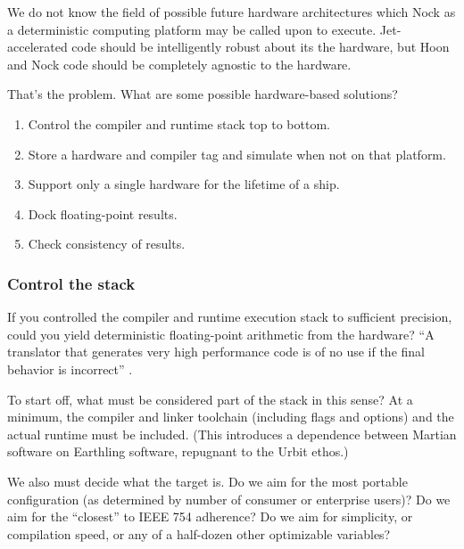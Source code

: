 \documentclass[twoside]{article}
\begin{document}
We do not know the field of possible future hardware architectures which Nock as a deterministic computing platform may be called upon to execute.  Jet-accelerated code should be intelligently robust about its the hardware, but Hoon and Nock code should be completely agnostic to the hardware.

That's the problem.  What are some possible hardware-based solutions?

\begin{enumerate}
  \item  Control the compiler and runtime stack top to bottom.
  \item  Store a hardware and compiler tag and simulate when not on that platform.
  \item  Support only a single hardware for the lifetime of a ship.
  \item  Dock floating-point results.
  \item  Check consistency of results.
\end{enumerate}

\subsubsection{Control the stack}

If you controlled the compiler and runtime execution stack to sufficient precision, could you yield deterministic floating-point arithmetic from the hardware?  “A translator that generates very high performance code is of no use if the final behavior is incorrect” \citep[p.~189]{Jones2008}.

To start off, what must be considered part of the stack in this sense?  At a minimum, the compiler and linker toolchain (including flags and options) and the actual runtime must be included.  (This introduces a dependence between Martian software on Earthling software, repugnant to the Urbit ethos.)

We also must decide what the target is.  Do we aim for the most portable configuration (as determined by number of consumer or enterprise users)?  Do we aim for the “closest” to IEEE 754 adherence?  Do we aim for simplicity, or compilation speed, or any of a half-dozen other optimizable variables?
\end{document}
